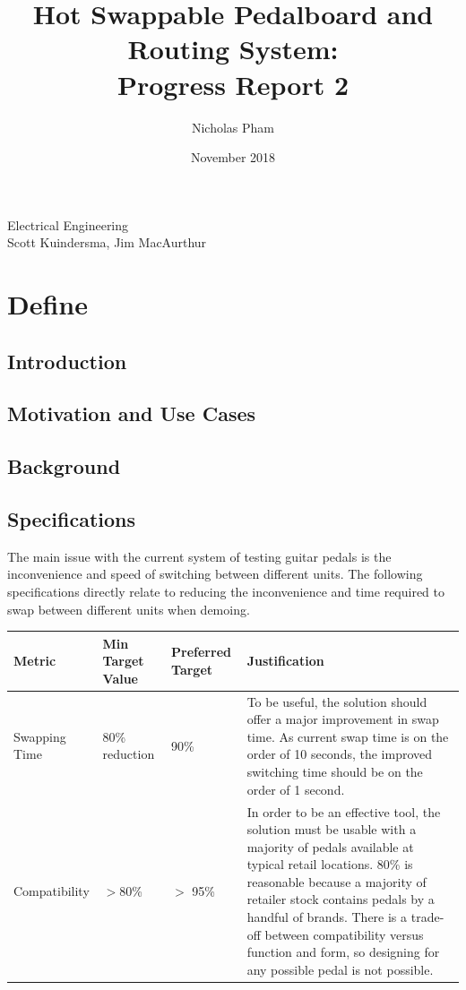 \documentclass{article}
\title{Hot Swappable Pedalboard and Routing System:\\Progress Report 2}
\author{Nicholas Pham}
\date{November 2018}
\begin{document}
\maketitle
\begin{center}
    Electrical Engineering \\
    Scott Kuindersma, Jim MacAurthur
\end{center}

\newpage
\glsaddall
\printglossaries
\newpage

\section{Define}
	\subsection{Introduction}
	\subsection{Motivation and Use Cases}
	\subsection{Background}
	\subsection{Specifications}
	The main issue with the current system of testing guitar pedals is the inconvenience and speed of switching between different units.  The following specifications directly relate to reducing the inconvenience and time required to swap between different units when demoing.

	\begin{center}
	\renewcommand{\arraystretch}{1.5}
	\begin{tabular}{|l|l|l|p{6cm}|}
		\hline
		Metric & Min Target Value & Preferred Target & Justification \\
		\hline
		Swapping Time & 80\% reduction & 90\% & To be useful, the solution should offer a major improvement in swap time.  As current swap time is on the order of 10 seconds, the improved switching time should be on the order of 1 second.\\
		Compatibility &  $>$80\% & $>$ 95\% & In order to be an effective tool, the solution must be usable with a majority of pedals available at typical retail locations.  80\% is reasonable because a majority of retailer stock contains pedals by a handful of brands.  There is a trade-off between compatibility versus function and form, so designing for any possible pedal is not possible. \\
		\hline
	\end{tabular}
	\end{center}
\end{document}
